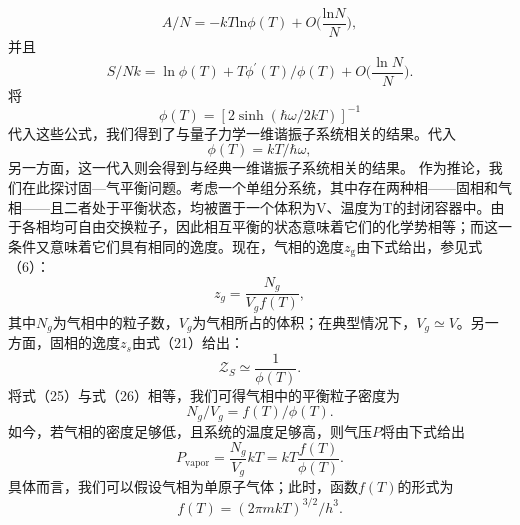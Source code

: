 \begin{equation}\tag{4.4.26}\label{eq:4.4.26}
A / N = - k T \mathrm { l n } \phi ( T ) + O \biggl ( \frac { \mathrm { l n } N } { N } \biggr ) ,
\end{equation}
并且
\begin{equation}\tag{4.4.27}\label{eq:4.4.27}
S / N k = \ln \phi ( T ) + T \phi ^{\prime} ( T ) / \phi ( T ) + O \biggl ( \frac { \ln N } { N } \biggr ) .
\end{equation}
将
\begin{equation}\tag{4.4.28}\label{eq:4.4.28}
\phi ( T ) = [ 2 \sinh ( \hbar \omega / 2 k T ) ] ^{- 1}
\end{equation}
代入这些公式，我们得到了与量子力学一维谐振子系统相关的结果。代入
\begin{equation}\tag{4.4.29}\label{eq:4.4.29}
\phi ( T ) = k T / \hbar \omega ,
\end{equation}
另一方面，这一代入则会得到与经典一维谐振子系统相关的结果。
作为推论，我们在此探讨固---气平衡问题。考虑一个单组分系统，其中存在两种相——固相和气相——且二者处于平衡状态，均被置于一个体积为V、温度为T的封闭容器中。由于各相均可自由交换粒子，因此相互平衡的状态意味着它们的化学势相等；而这一条件又意味着它们具有相同的逸度。现在，气相的逸度\(z_{\mathrm{g}}\)由下式给出，参见式（6）：
\begin{equation}\tag{4.4.30}\label{eq:4.4.30}
z _ { g } = \frac { N _ { g } } { V _ { g } f ( T ) } ,
\end{equation}
其中\(N_{g}\)为气相中的粒子数，\(V_{g}\)为气相所占的体积；在典型情况下，\(V_{g} \simeq V\)。另一方面，固相的逸度\(z_{s}\)由式（21）给出：
\begin{equation}\tag{4.4.31}\label{eq:4.4.31}
\mathcal { Z } _ { S } \simeq \frac { 1 } { \phi ( T ) } .
\end{equation}
将式（25）与式（26）相等，我们可得气相中的平衡粒子密度为
\begin{equation}\tag{4.4.32}\label{eq:4.4.32}
N _ { g } / V _ { g } = f ( T ) / \phi ( T ) .
\end{equation}
如今，若气相的密度足够低，且系统的温度足够高，则气压\(P\)将由下式给出
\begin{equation}\tag{4.4.33}\label{eq:4.4.33}
P _ { \mathrm { v a p o r } } = \frac { N _ { g } } { V _ { g } } k T = k T \frac { f ( T ) } { \phi ( T ) } .
\end{equation}
具体而言，我们可以假设气相为单原子气体；此时，函数\(f(T)\)的形式为
\begin{equation}\tag{4.4.34}\label{eq:4.4.34}
f ( T ) = ( 2 \pi m k T ) ^{3 / 2} / h ^{3} .
\end{equation}
